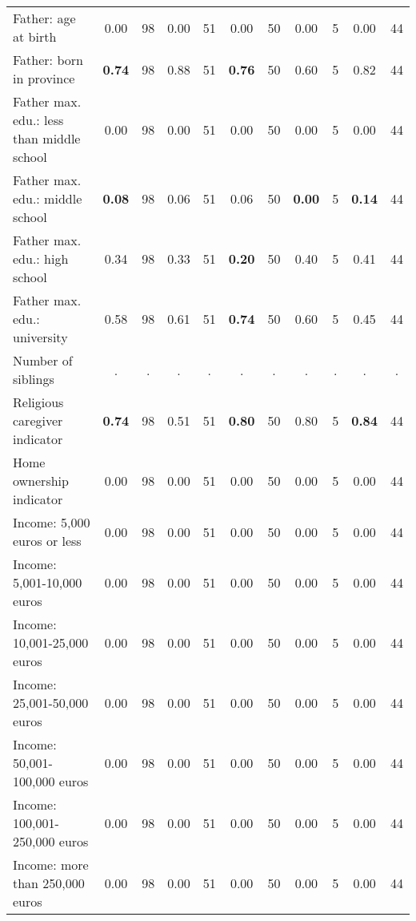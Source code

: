 \begin{tabular}{l c c c c c c c c c c}
Father: age at birth &      0.00 &        98 &      0.00 &        51 &      0.00 &        50 &      0.00 &         5 &      0.00 &        44 \\
Father: born in province & \textbf{     0.74} &        98 &      0.88 &        51 & \textbf{     0.76} &        50 &      0.60 &         5 &      0.82 &        44 \\
Father max. edu.: less than middle school &      0.00 &        98 &      0.00 &        51 &      0.00 &        50 &      0.00 &         5 &      0.00 &        44 \\
Father max. edu.: middle school & \textbf{     0.08} &        98 &      0.06 &        51 &      0.06 &        50 & \textbf{     0.00} &         5 & \textbf{     0.14} &        44 \\
Father max. edu.: high school &      0.34 &        98 &      0.33 &        51 & \textbf{     0.20} &        50 &      0.40 &         5 &      0.41 &        44 \\
Father max. edu.: university &      0.58 &        98 &      0.61 &        51 & \textbf{     0.74} &        50 &      0.60 &         5 &      0.45 &        44 \\
Number of siblings &         . & . &         . & . &         . & . &         . & . &         . & . \\
Religious caregiver indicator & \textbf{     0.74} &        98 &      0.51 &        51 & \textbf{     0.80} &        50 &      0.80 &         5 & \textbf{     0.84} &        44 \\
Home ownership indicator &      0.00 &        98 &      0.00 &        51 &      0.00 &        50 &      0.00 &         5 &      0.00 &        44 \\
Income: 5,000 euros or less &      0.00 &        98 &      0.00 &        51 &      0.00 &        50 &      0.00 &         5 &      0.00 &        44 \\
Income: 5,001-10,000 euros &      0.00 &        98 &      0.00 &        51 &      0.00 &        50 &      0.00 &         5 &      0.00 &        44 \\
Income: 10,001-25,000 euros &      0.00 &        98 &      0.00 &        51 &      0.00 &        50 &      0.00 &         5 &      0.00 &        44 \\
Income: 25,001-50,000 euros &      0.00 &        98 &      0.00 &        51 &      0.00 &        50 &      0.00 &         5 &      0.00 &        44 \\
Income: 50,001-100,000 euros &      0.00 &        98 &      0.00 &        51 &      0.00 &        50 &      0.00 &         5 &      0.00 &        44 \\
Income: 100,001-250,000 euros &      0.00 &        98 &      0.00 &        51 &      0.00 &        50 &      0.00 &         5 &      0.00 &        44 \\
Income: more than 250,000 euros &      0.00 &        98 &      0.00 &        51 &      0.00 &        50 &      0.00 &         5 &      0.00 &        44 \\
\bottomrule
\end{tabular}
